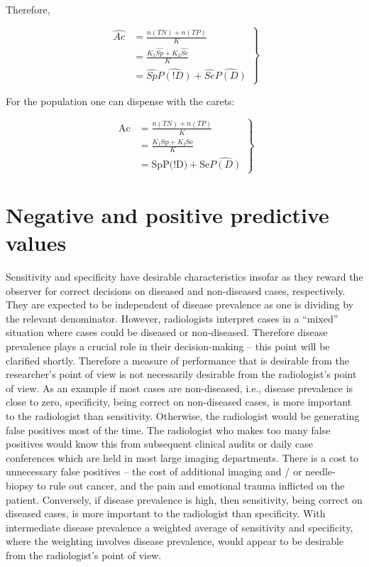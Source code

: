 \documentclass[
]{book}
\begin{document}
Therefore,

\begin{equation} 
\left.
\begin{aligned}  
\widehat{Ac}&=\frac{n(TN)+n(TP)}{K}\\
&=\frac{K_1 \widehat{Sp}+K_2 \widehat{Se}}{K}\\
&=\widehat{Sp} \widehat{P(!D)}+\widehat{Se}\widehat{P(D)}
\end{aligned}
\right \}
\label{eq:binary-task-ac}
\end{equation}

For the population one can dispense with the carets:

\begin{equation} 
\left.
\begin{aligned}  
\text{Ac}&=\frac{n(TN)+n(TP)}{K}\\
&=\frac{K_1 \text{Sp}+K_2 \text{Se}}{K}\\
&=\text{Sp} \text{P(!D)}+\text{Se}\widehat{P(D)}
\end{aligned}
\right \}
\label{eq:binary-task-ac-pop}
\end{equation}

\hypertarget{negative-and-positive-predictive-values}{%
\section{Negative and positive predictive values}\label{negative-and-positive-predictive-values}}

Sensitivity and specificity have desirable characteristics insofar as they reward the observer for correct decisions on diseased and non-diseased cases, respectively. They are expected to be independent of disease prevalence as one is dividing by the relevant denominator. However, radiologists interpret cases in a ``mixed'' situation where cases could be diseased or non-diseased. Therefore disease prevalence plays a crucial role in their decision-making -- this point will be clarified shortly. Therefore a measure of performance that is desirable from the researcher's point of view is not necessarily desirable from the radiologist's point of view. As an example if most cases are non-diseased, i.e., disease prevalence is close to zero, specificity, being correct on non-diseased cases, is more important to the radiologist than sensitivity. Otherwise, the radiologist would be generating false positives most of the time. The radiologist who makes too many false positives would know this from subsequent clinical audits or daily case conferences which are held in most large imaging departments. There is a cost to unnecessary false positives -- the cost of additional imaging and / or needle-biopsy to rule out cancer, and the pain and emotional trauma inflicted on the patient. Conversely, if disease prevalence is high, then sensitivity, being correct on diseased cases, is more important to the radiologist than specificity. With intermediate disease prevalence a weighted average of sensitivity and specificity, where the weighting involves disease prevalence, would appear to be desirable from the radiologist's point of view.
\end{document}
